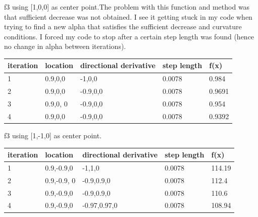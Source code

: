 \documentclass[7pt]{article}
\begin{document}
		f3 using [1,0,0] as center point.The problem with this function and method was that sufficient decrease was not obtained. I see it getting stuck in my code when trying to find a new alpha that satisfies the sufficient decrease and curvature conditions. I forced my code to stop after a certain step length was found (hence no change in alpha between iterations). 
	\begin{center}
		\begin{tabular}{ | l | l | l | l | l |}
			\hline
			iteration & location & directional derivative & step length & f(x) \\ \hline
			1& 0.9,0,0  & -1,0,0  & 0.0078 & 0.984\\ \hline
			2& 0.9,0,0  & -0.9,0,0 & 0.0078 & 0.9691\\ \hline
			3& 0.9,0, 0 & -0.9,0,0 & 0.0078 & 0.954\\ \hline
			4& 0.9,0,0 & -0.9,0,0 & 0.0078 & 0.9392\\
			\hline
		\end{tabular}
	\end{center}


f3 using [1,-1,0] as center point. 	
	\begin{center}
		\begin{tabular}{ | l | l | l | l | l |}
			\hline
			iteration & location & directional derivative & step length & f(x) \\ \hline
			1& 0.9,-0.9,0 & -1,1,0 & 0.0078 & 114.19\\ \hline
			2& 0.9,-0.9, 0& -0.9,0.9,0  & 0.0078  & 112.4\\ \hline
			3& 0.9,-0.9,0 & -0.9,0.9,0  & 0.0078  & 110.6\\ \hline
			4& 0.9,-0.9,0 & -0.97,0.97,0 & 0.0078 & 108.94\\
			\hline
		\end{tabular}
	\end{center}
	
	
\end{document}
